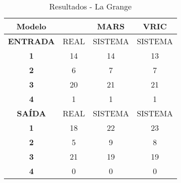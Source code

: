 \begin{table}[htp]
\centering
\caption{Resultados - La Grange}
\label{tab:lagrange_final}
{%
\begin{tabular}{cccc}
\multicolumn{1}{c|}{\textbf{Modelo}}        & \textbf{}     & \textbf{MARS} & \textbf{VRIC}    \\ \hline
\multicolumn{1}{c|}{\textbf{ENTRADA}} & REAL & SISTEMA     & SISTEMA \\ \hline
\multicolumn{1}{c|}{\textbf{1}} & 14   & 14      & 13      \\
\multicolumn{1}{c|}{\textbf{2}} & 6    & 7       & 7       \\
\multicolumn{1}{c|}{\textbf{3}} & 20   & 21      & 21      \\
\multicolumn{1}{c|}{\textbf{4}} & 1    & 1       & 1       \\ \hline
\textbf{SAÍDA}                  & REAL & SISTEMA & SISTEMA \\ \hline
\multicolumn{1}{c|}{\textbf{1}} & 18   & 22      & 23      \\
\multicolumn{1}{c|}{\textbf{2}} & 5    & 9       & 8       \\
\multicolumn{1}{c|}{\textbf{3}} & 21   & 19      & 19      \\
\multicolumn{1}{c|}{\textbf{4}} & 0    & 0       & 0       \\ \hline
\end{tabular}%

\oautor
}
\end{table}